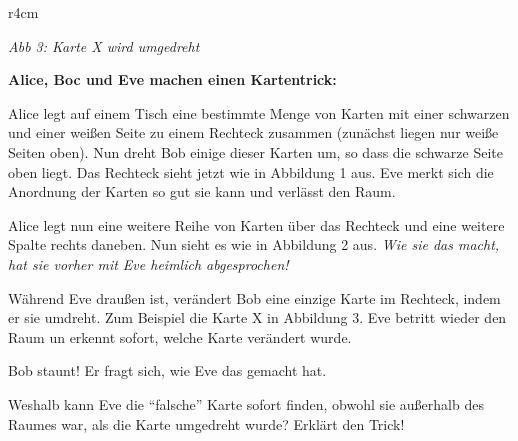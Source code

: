 \documentclass[10pt, a4paper]{scrartcl}
\begin{document}
\begin{wrapfig}
\begin{wrapfigure}{r}{4cm}
\emph{Abb 3: Karte X wird umgedreht}
\end{wrapfigure}
\textbf{Alice, Boc und Eve machen einen Kartentrick:}

Alice legt auf einem Tisch eine bestimmte Menge von Karten mit einer schwarzen und einer weißen Seite zu einem Rechteck zusammen (zunächst liegen nur weiße Seiten oben). Nun dreht Bob einige dieser Karten um, so dass die schwarze Seite oben liegt. Das Rechteck sieht jetzt wie in Abbildung 1 aus. Eve merkt sich die Anordnung der Karten so gut sie kann und verlässt den Raum.

Alice legt nun eine weitere Reihe von Karten über das Rechteck und eine weitere Spalte rechts daneben. Nun sieht es wie in Abbildung 2 aus. \textit{Wie sie das macht, hat sie vorher mit Eve heimlich abgesprochen!}

Während Eve draußen ist, verändert Bob eine einzige Karte im Rechteck, indem er sie umdreht. Zum Beispiel die Karte X in Abbildung 3. Eve betritt wieder den Raum un erkennt sofort, welche Karte verändert wurde.

Bob staunt! Er fragt sich, wie Eve das gemacht hat.

\begin{aufgabe}[symbol=\Large\symPartner]
	Weshalb kann Eve die \enquote{falsche} Karte sofort finden, obwohl sie außerhalb des Raumes war, als die Karte umgedreht wurde? Erklärt den Trick!
	

\end{aufgabe}
\end{wrapfig}
\end{document}
